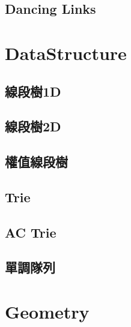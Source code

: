     \subsection{Dancing Links}
        

\section{DataStructure}
    \subsection{線段樹1D}
        
    \subsection{線段樹2D}
        
    \subsection{權值線段樹}
        
    \subsection{Trie}
        
    \subsection{AC Trie}
        
    \subsection{單調隊列}
        
        
\section{Geometry}
